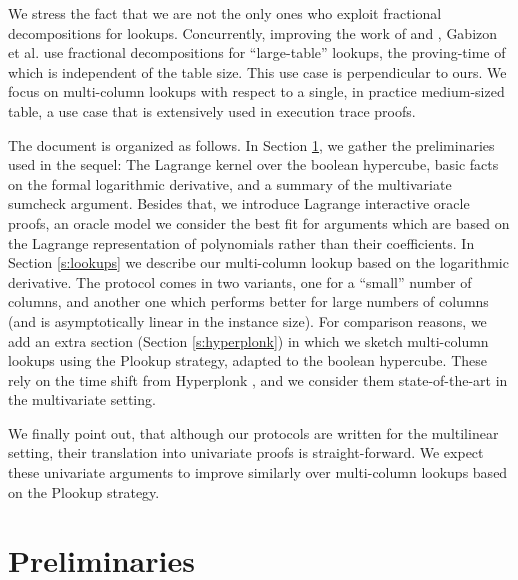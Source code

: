 \documentclass[11pt]{article}
\theoremstyle{definition}
\theoremstyle{remark}
\begin{document}
We stress the fact that we are not the only ones who exploit fractional decompositions for lookups. 
Concurrently, improving the work of \cite{Caulk} and \cite{CaulkPlus}, Gabizon et al. \cite{flookup} use fractional decompositions for ``large-table'' lookups, the proving-time of which is independent of the table size. 
This use case is perpendicular to ours.
We focus on multi-column lookups with respect to a single, in practice medium-sized table, a use case that is extensively used in execution trace proofs.

The document is organized as follows. 
In Section \ref{s:preliminaries}, we gather the preliminaries used in the sequel: 
The Lagrange kernel over the boolean hypercube,  basic facts on the formal logarithmic derivative, and a summary of the multivariate sumcheck argument. 
Besides that, we introduce Lagrange interactive oracle proofs, an oracle model we consider the best fit for arguments which are based on the Lagrange representation of polynomials rather than their coefficients.   
In Section \ref{s:lookups} we describe our multi-column lookup based on the logarithmic derivative. 
The protocol comes in two variants, one for a ``small'' number of columns, and another one which performs better for large numbers of columns (and is asymptotically linear in the instance size). 
For comparison reasons, we add an extra section (Section \ref{s:hyperplonk}) in which we sketch multi-column lookups using the Plookup strategy, adapted to the boolean hypercube. 
These rely on the time shift from Hyperplonk \cite{Hyperplonk}, and we consider them state-of-the-art in the multivariate setting.

We finally point out, that although our protocols are written for the multilinear setting,  their translation into univariate proofs is straight-forward.
We expect these univariate arguments to improve similarly over multi-column lookups based on the Plookup strategy.






\section{Preliminaries}
\label{s:preliminaries}
\end{document}
